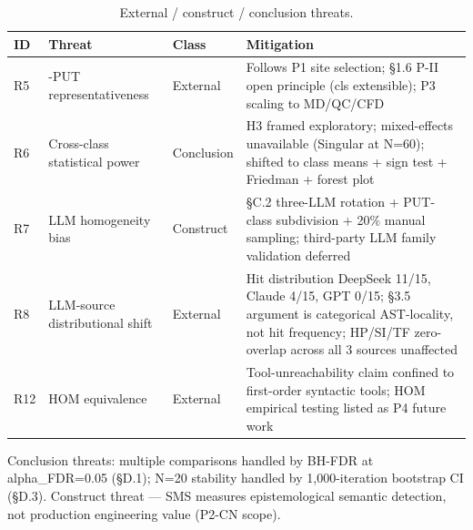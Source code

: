\documentclass[review,12pt,authoryear]{elsarticle}
\begin{document}
{\def\LTcaptype{table} %
\begin{longtable}[]{@{}
  >{\raggedright\arraybackslash}p{}
  >{\raggedright\arraybackslash}p{}
  >{\raggedright\arraybackslash}p{}
  >{\raggedright\arraybackslash}p{}@{}}
\caption{External / construct / conclusion threats.}\label{tab:p2-28}\\
\toprule\noalign{}
\begin{minipage}[b]{\linewidth}\raggedright
ID
\end{minipage} & \begin{minipage}[b]{\linewidth}\raggedright
Threat
\end{minipage} & \begin{minipage}[b]{\linewidth}\raggedright
Class
\end{minipage} & \begin{minipage}[b]{\linewidth}\raggedright
Mitigation
\end{minipage} \\
\midrule\noalign{}
\endhead
\bottomrule\noalign{}
\endlastfoot
R5 & 12-PUT representativeness & External & Follows P1 site selection;
§1.6 P-II open principle (cls extensible); P3 scaling to MD/QC/CFD \\
R6 & Cross-class statistical power & Conclusion & H3 framed exploratory;
mixed-effects unavailable (Singular at N=60); shifted to class means +
sign test + Friedman + forest plot \\
R7 & LLM homogeneity bias & Construct & §C.2 three-LLM rotation +
PUT-class subdivision + 20\% manual sampling; third-party LLM family
validation deferred \\
R8 & LLM-source distributional shift & External & Hit distribution
DeepSeek 11/15, Claude 4/15, GPT 0/15; §3.5 argument is categorical
AST-locality, not hit frequency; HP/SI/TF zero-overlap across all 3
sources unaffected \\
R12 & HOM equivalence & External & Tool-unreachability claim confined to
first-order syntactic tools; HOM empirical testing listed as P4 future
work \\
\end{longtable}
}

Conclusion threats: multiple comparisons handled by BH-FDR at
alpha\_FDR=0.05 (§D.1); N=20 stability handled by 1,000-iteration
bootstrap CI (§D.3). Construct threat --- SMS measures epistemological
semantic detection, not production engineering value (P2-CN scope).
\end{document}
